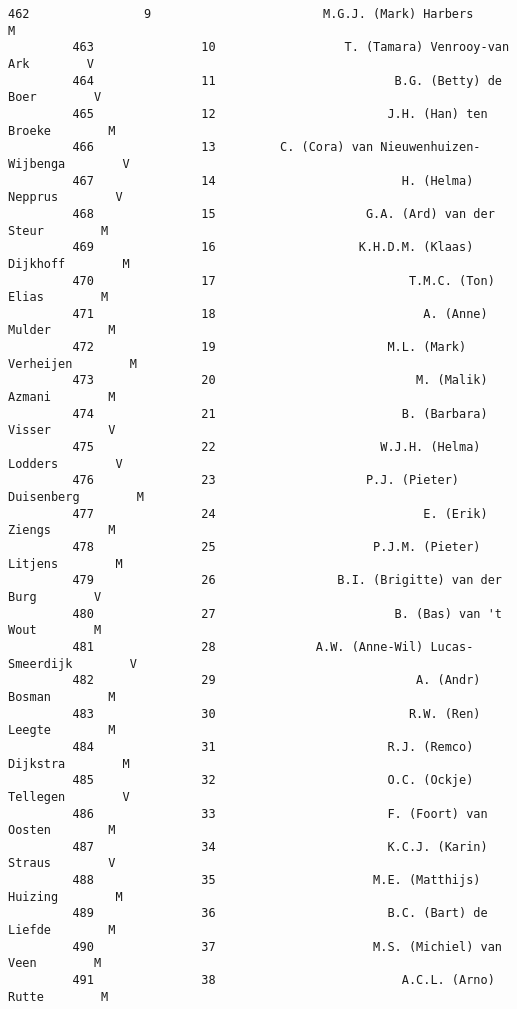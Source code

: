\documentclass{article}
\begin{document}
\begin{Verbatim}[commandchars=\\\{\}]
         462                9                        M.G.J. (Mark) Harbers        M   
         463               10                  T. (Tamara) Venrooy-van Ark        V   
         464               11                         B.G. (Betty) de Boer        V   
         465               12                        J.H. (Han) ten Broeke        M   
         466               13         C. (Cora) van Nieuwenhuizen-Wijbenga        V   
         467               14                          H. (Helma) Nepprus        V   
         468               15                     G.A. (Ard) van der Steur        M   
         469               16                    K.H.D.M. (Klaas) Dijkhoff        M   
         470               17                           T.M.C. (Ton) Elias        M   
         471               18                             A. (Anne) Mulder        M   
         472               19                        M.L. (Mark) Verheijen        M   
         473               20                            M. (Malik) Azmani        M   
         474               21                          B. (Barbara) Visser        V   
         475               22                       W.J.H. (Helma) Lodders        V   
         476               23                     P.J. (Pieter) Duisenberg        M   
         477               24                             E. (Erik) Ziengs        M   
         478               25                      P.J.M. (Pieter) Litjens        M   
         479               26                 B.I. (Brigitte) van der Burg        V   
         480               27                         B. (Bas) van 't Wout        M   
         481               28              A.W. (Anne-Wil) Lucas-Smeerdijk        V   
         482               29                            A. (Andr) Bosman        M   
         483               30                           R.W. (Ren) Leegte        M   
         484               31                        R.J. (Remco) Dijkstra        M   
         485               32                        O.C. (Ockje) Tellegen        V   
         486               33                        F. (Foort) van Oosten        M   
         487               34                        K.C.J. (Karin) Straus        V   
         488               35                      M.E. (Matthijs) Huizing        M   
         489               36                        B.C. (Bart) de Liefde        M   
         490               37                      M.S. (Michiel) van Veen        M   
         491               38                          A.C.L. (Arno) Rutte        M   

\end{Verbatim}
\end{document}
